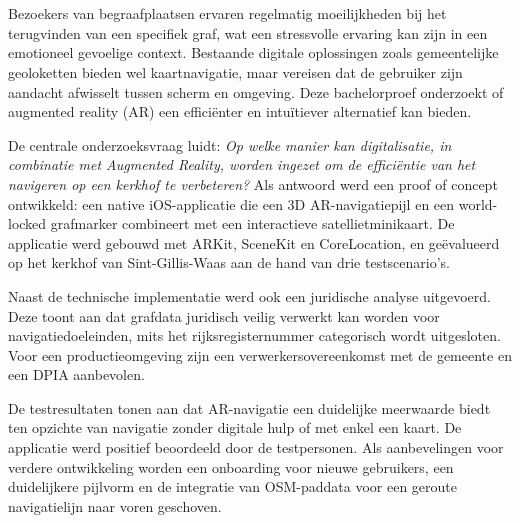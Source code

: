 \chapter*{}

Bezoekers van begraafplaatsen ervaren regelmatig moeilijkheden bij het
terugvinden van een specifiek graf, wat een stressvolle ervaring kan zijn in een
emotioneel gevoelige context. Bestaande digitale oplossingen zoals gemeentelijke
geoloketten bieden wel kaartnavigatie, maar vereisen dat de gebruiker zijn
aandacht afwisselt tussen scherm en omgeving. Deze bachelorproef onderzoekt of
augmented reality (AR) een efficiënter en intuïtiever alternatief kan bieden.

De centrale onderzoeksvraag luidt: \textit{Op welke manier kan digitalisatie,
    in combinatie met Augmented Reality, worden ingezet om de efficiëntie van het
    navigeren op een kerkhof te verbeteren?} Als antwoord werd een proof of concept
ontwikkeld: een native iOS-applicatie die een 3D AR-navigatiepijl en een
world-locked grafmarker combineert met een interactieve satellietminikaart.
De applicatie werd gebouwd met ARKit, SceneKit en CoreLocation, en geëvalueerd
op het kerkhof van Sint-Gillis-Waas aan de hand van drie testscenario's.

Naast de technische implementatie werd ook een juridische analyse uitgevoerd.
Deze toont aan dat grafdata juridisch veilig verwerkt kan worden voor
navigatiedoeleinden, mits het rijksregisternummer categorisch wordt uitgesloten.
Voor een productieomgeving zijn een verwerkersovereenkomst met de gemeente en
een DPIA aanbevolen.

De testresultaten tonen aan dat AR-navigatie een duidelijke meerwaarde biedt
ten opzichte van navigatie zonder digitale hulp of met enkel een kaart.
De applicatie werd positief beoordeeld door de testpersonen. Als
aanbevelingen voor verdere ontwikkeling worden een onboarding voor nieuwe
gebruikers, een duidelijkere pijlvorm en de integratie van OSM-paddata voor
een geroute navigatielijn naar voren geschoven.